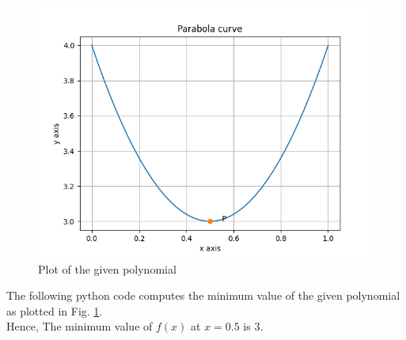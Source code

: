 \documentclass[journal,12pt,twocolumn]{IEEEtran}
\begin{document}
		\begin{figure}[!ht]
	\centering
	\includegraphics[width=\columnwidth]{Figure_1.png}
	\caption{Plot of the given polynomial}
	\label{fig:5.1}	
	\end{figure}
The following python code computes the minimum value of the given polynomial as plotted in Fig. \ref{fig:5.1}.\\
Hence, The minimum value of $f(x)$ at $x=0.5$ is 3.
\end{document}
